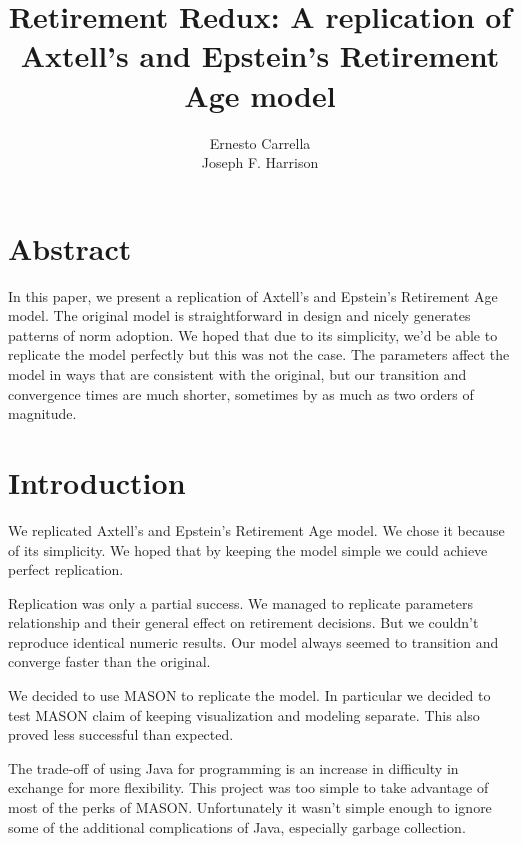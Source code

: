 \documentclass[runningheads,a4paper]{article}
\newcommand{\doctitle}[0]{Retirement Redux: A replication of Axtell's and Epstein's Retirement Age model}
\begin{document}
\title{\doctitle}
\author{Ernesto Carrella \\ Joseph F. Harrison}

\maketitle

\section*{Abstract}
In this paper, we present a replication of Axtell's and Epstein's Retirement Age model\cite{axtell_coordination_2006}. 
The original model is straightforward in design and nicely generates patterns of norm adoption. 
We hoped that due to its simplicity, we'd be able to replicate the model perfectly but this was not the case.
The parameters affect the model in ways that are consistent with the original, but our transition and convergence times
are much shorter, sometimes by as much as two orders of magnitude.

\section{Introduction}
\label{sec:intro}

We replicated Axtell's and Epstein's Retirement Age model\cite{axtell_coordination_2006}. 
We chose it because of its simplicity.
We hoped that by keeping the model simple we could achieve perfect replication.

Replication was only a partial success.
We managed to replicate parameters relationship and their general effect on retirement decisions.
But we couldn't reproduce identical numeric results.
Our model always seemed to transition and converge faster than the original.

We decided to use MASON to replicate the model.
In particular we decided to test MASON claim of keeping visualization and modeling separate.
This also proved less successful than expected.

The trade-off of using Java for programming is an increase in difficulty in exchange for more flexibility.
This project was too simple to take advantage of most of the perks of MASON.
Unfortunately it wasn't simple enough to ignore some of the additional complications of Java, especially garbage collection.
\end{document}
